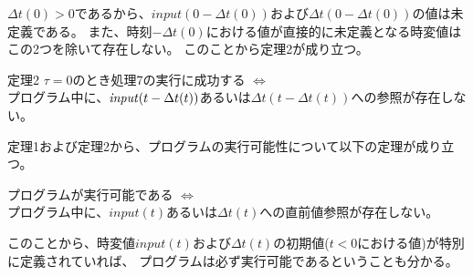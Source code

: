 $\Delta t(0) > 0$であるから、$input(0-\Delta t(0))$および$\Delta t(0-\Delta t(0))$の値は未定義である。
また、時刻$-\Delta t(0)$における値が直接的に未定義となる時変値はこの2つを除いて存在しない。
このことから定理2が成り立つ。
\begin{itembox}[l]{定理2}
  $\tau = 0$のとき処理7の実行に成功する $\Longleftrightarrow$ \\
  プログラム中に、${\it input}(t - \Delta t(t))$あるいは$\Delta t(t - \Delta t(t))$への参照が存在しない。
\end{itembox}

定理1および定理2から、プログラムの実行可能性について以下の定理が成り立つ。
\begin{screen}
  プログラムが実行可能である $\Longleftrightarrow$ \\
  プログラム中に、$input(t)$あるいは$\Delta t(t)$への直前値参照が存在しない。
\end{screen}

このことから、時変値$input(t)$および$\Delta t(t)$の初期値($t < 0$における値)が特別に定義されていれば、
プログラムは必ず実行可能であるということも分かる。
